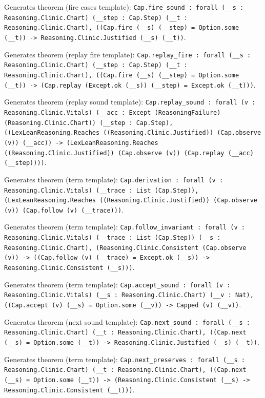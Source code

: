 \documentclass[11pt]{article}
\begin{document}
\noindent Generates theorem (fire cases template): \texttt{Cap.fire\_sound : forall (\_\_s : Reasoning.Clinic.Chart) (\_\_step : Cap.Step) (\_\_t : Reasoning.Clinic.Chart), ((Cap.fire (\_\_s) (\_\_step) = Option.some (\_\_t)) -> Reasoning.Clinic.Justified (\_\_s) (\_\_t))}.\par
\noindent Generates theorem (replay fire template): \texttt{Cap.replay\_fire : forall (\_\_s : Reasoning.Clinic.Chart) (\_\_step : Cap.Step) (\_\_t : Reasoning.Clinic.Chart), ((Cap.fire (\_\_s) (\_\_step) = Option.some (\_\_t)) -> (Cap.replay (Except.ok (\_\_s)) (\_\_step) = Except.ok (\_\_t)))}.\par
\noindent Generates theorem (replay sound template): \texttt{Cap.replay\_sound : forall (v : Reasoning.Clinic.Vitals) (\_\_acc : Except (ReasoningFailure) (Reasoning.Clinic.Chart)) (\_\_step : Cap.Step), ((LexLeanReasoning.Reaches ((Reasoning.Clinic.Justified)) (Cap.observe (v)) (\_\_acc)) -> (LexLeanReasoning.Reaches ((Reasoning.Clinic.Justified)) (Cap.observe (v)) (Cap.replay (\_\_acc) (\_\_step))))}.\par
\noindent Generates theorem (term template): \texttt{Cap.derivation : forall (v : Reasoning.Clinic.Vitals) (\_\_trace : List (Cap.Step)), (LexLeanReasoning.Reaches ((Reasoning.Clinic.Justified)) (Cap.observe (v)) (Cap.follow (v) (\_\_trace)))}.\par
\noindent Generates theorem (term template): \texttt{Cap.follow\_invariant : forall (v : Reasoning.Clinic.Vitals) (\_\_trace : List (Cap.Step)) (\_\_s : Reasoning.Clinic.Chart), (Reasoning.Clinic.Consistent (Cap.observe (v)) -> ((Cap.follow (v) (\_\_trace) = Except.ok (\_\_s)) -> Reasoning.Clinic.Consistent (\_\_s)))}.\par
\noindent Generates theorem (term template): \texttt{Cap.accept\_sound : forall (v : Reasoning.Clinic.Vitals) (\_\_s : Reasoning.Clinic.Chart) (\_\_v : Nat), ((Cap.accept (v) (\_\_s) = Option.some (\_\_v)) -> Capped (v) (\_\_v))}.\par
\noindent Generates theorem (next sound template): \texttt{Cap.next\_sound : forall (\_\_s : Reasoning.Clinic.Chart) (\_\_t : Reasoning.Clinic.Chart), ((Cap.next (\_\_s) = Option.some (\_\_t)) -> Reasoning.Clinic.Justified (\_\_s) (\_\_t))}.\par
\noindent Generates theorem (term template): \texttt{Cap.next\_preserves : forall (\_\_s : Reasoning.Clinic.Chart) (\_\_t : Reasoning.Clinic.Chart), ((Cap.next (\_\_s) = Option.some (\_\_t)) -> (Reasoning.Clinic.Consistent (\_\_s) -> Reasoning.Clinic.Consistent (\_\_t)))}.\par
\end{document}
